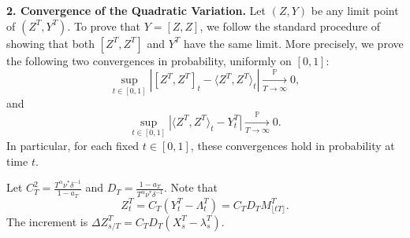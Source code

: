 \documentclass[letterpaper]{article}
\numberwithin{equation}{section}
\theoremstyle{definition}
\theoremstyle{remark}
\begin{document}

\textbf{2. Convergence of the Quadratic Variation.}
Let $(Z,Y)$ be any limit point of $(Z^T, Y^T)$. To prove that $Y=[Z,Z]$, we follow the standard procedure of showing that both $[Z^T, Z^T]$ and $Y^T$ have the same limit. {More precisely, we prove the following two convergences in probability, uniformly on $[0,1]$:}
\[
  {\sup_{t\in[0,1]}\left|[Z^T, Z^T]_t - \langle Z^T, Z^T \rangle_t\right| \xrightarrow[T\to\infty]{\mathbb P} 0,}
\]
and
\[
  {\sup_{t\in[0,1]}\left|\langle Z^T, Z^T \rangle_t - Y^T_t\right| \xrightarrow[T\to\infty]{\mathbb P} 0.}
\]
{In particular, for each fixed $t\in[0,1]$, these convergences hold in probability at time $t$.}

Let $C_T^2 = \frac{T^\alpha \nu^* \delta^{-1}}{1-a_T}$ and $D_T = \frac{1-a_T}{T^\alpha \nu^* \delta^{-1}}$. Note that 
\[
  Z_t^T = C_T (Y_t^T - \Lambda_t^T) = C_T D_T M_{\lfloor tT \rfloor}^T.
\]
The increment is $\Delta Z_{s/T}^T = C_T D_T (X_s^T - \lambda_s^T)$.
\end{document}
